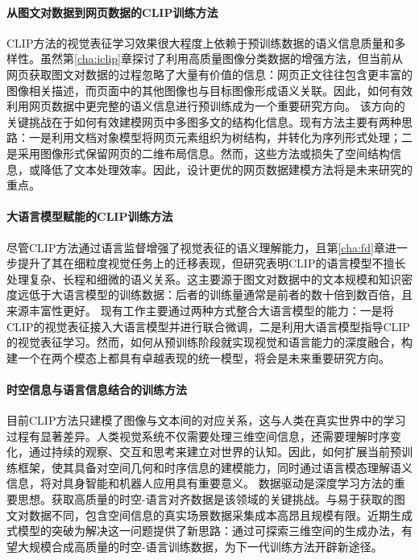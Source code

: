 \paragraph{从图文对数据到网页数据的CLIP训练方法}
CLIP方法的视觉表征学习效果很大程度上依赖于预训练数据的语义信息质量和多样性。虽然第\ref{cha:iclip}章探讨了利用高质量图像分类数据的增强方法，但当前从网页获取图文对数据的过程忽略了大量有价值的信息：网页正文往往包含更丰富的图像相关描述，而页面中的其他图像也与目标图像形成语义关联。因此，如何有效利用网页数据中更完整的语义信息进行预训练\cite{S4, NEURIPS2024_2a952768}成为一个重要研究方向。
该方向的关键挑战在于如何有效建模网页中多图多文的结构化信息。现有方法主要有两种思路：一是利用文档对象模型将网页元素组织为树结构，并转化为序列形式处理\cite{DomLM,layoutlm}；二是采用图像形式保留网页的二维布局信息\cite{CLIPPO}。然而，这些方法或损失了空间结构信息，或降低了文本处理效率。因此，设计更优的网页数据建模方法将是未来研究的重点。

\paragraph{大语言模型赋能的CLIP训练方法}
尽管CLIP方法通过语言监督增强了视觉表征的语义理解能力，且第\ref{cha:fd}章进一步提升了其在细粒度视觉任务上的迁移表现，但研究表明\cite{bow,CLIPA}CLIP的语言模型不擅长处理复杂、长程和细微的语义关系。这主要源于图文对数据中的文本规模和知识密度远低于大语言模型的训练数据：后者的训练量通常是前者的数十倍到数百倍\cite{gpt4, dsv3, radford2021learning}，且来源丰富性更好。
现有工作主要通过两种方式整合大语言模型的能力：一是将CLIP的视觉表征接入大语言模型并进行联合微调\cite{blip-2, llava}，二是利用大语言模型指导CLIP的视觉表征学习\cite{LLM2CLIP}。然而，如何从预训练阶段就实现视觉和语言能力的深度融合，构建一个在两个模态上都具有卓越表现的统一模型\cite{gemini}，将会是未来重要研究方向。

\paragraph{时空信息与语言信息结合的训练方法}
目前CLIP方法只建模了图像与文本间的对应关系，这与人类在真实世界中的学习过程有显著差异。人类视觉系统不仅需要处理三维空间信息，还需要理解时序变化，通过持续的观察、交互和思考来建立对世界的认知。因此，如何扩展当前预训练框架，使其具备对空间几何和时序信息的建模能力，同时通过语言模态理解语义信息，将对具身智能和机器人应用具有重要意义。
数据驱动是深度学习方法的重要思想。获取高质量的时空-语言对齐数据是该领域的关键挑战。与易于获取的图文对数据不同，包含空间信息的真实场景数据采集成本高昂且规模有限。近期生成式模型的突破\cite{latentdiff,veo2}为解决这一问题提供了新思路：通过可探索三维空间的生成办法\cite{genex, genie2}，有望大规模合成高质量的时空-语言训练数据，为下一代训练方法开辟新途径。

